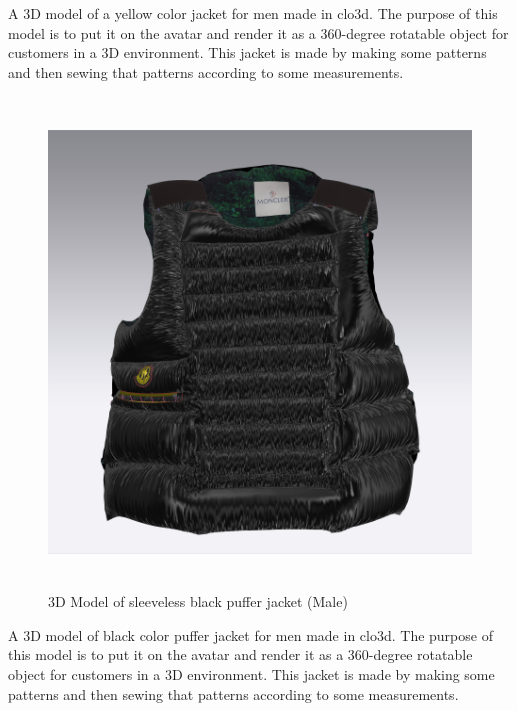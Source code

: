 \justifying
A 3D model of a yellow color jacket for men made in clo3d. The purpose of this model is to put it on the avatar and render it as a 360-degree rotatable object for customers in a 3D environment. This jacket is made by making some patterns and then sewing that patterns according to some measurements.
\begin{figure}[H]
    \centering
    \includegraphics[width=13cm,height=13cm]{Figures/3DJackets/male4.png}
    \caption{3D Model of sleeveless black puffer jacket (Male)}
    \label{fig4:3D Model of sleeveless black puffer jacket (Male)}
  
\end{figure}
\justifying
A 3D model of black color puffer jacket for men made in clo3d. The purpose of this model is to put it on the avatar and render it as a 360-degree rotatable object for customers in a 3D environment. This jacket is made by making some patterns and then sewing that patterns according to some measurements.
